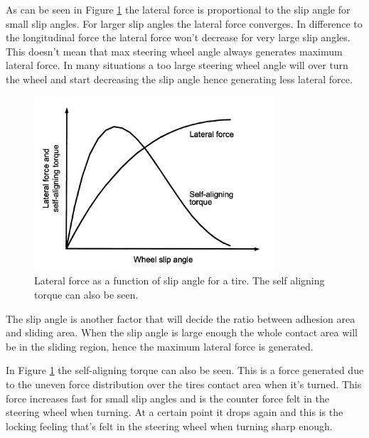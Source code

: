 As can be seen in Figure \ref{slipangle_latforce} the lateral force is proportional to the slip angle for small slip angles. For larger slip angles the lateral force converges. In difference to the longitudinal force the lateral force won't decrease for very large slip angles. This doesn't mean that max steering wheel angle always generates maximum lateral force. In many situations a too large steering wheel angle will over turn the wheel and start decreasing the slip angle hence generating less lateral force.
\begin{figure}[h]
	\centering
	\includegraphics[width=0.8\textwidth]{Pictures/slipangle_latforce}
	\caption{Lateral force as a function of slip angle for a tire. The self aligning torque can also be seen. \cite{sae2004}}
	\label{slipangle_latforce}
\end{figure}

The slip angle is another factor that will decide the ratio between adhesion area and sliding area. When the slip angle is large enough the whole contact area will be in the sliding region, hence the maximum lateral force is generated.

In Figure \ref{slipangle_latforce} the self-aligning torque can also be seen. This is a force generated due to the uneven force distribution over the tires contact area when it's turned. This force increases fast for small slip angles and is the counter force felt in the steering wheel when turning. At a certain point it drops again and this is the locking feeling that's felt in the steering wheel when turning sharp enough.

